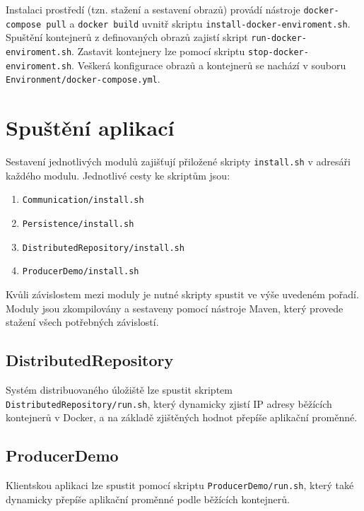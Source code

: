 Instalaci prostředí (tzn. stažení a sestavení obrazů) provádí nástroje \texttt{docker-compose pull} a \texttt{docker build} uvnitř skriptu \texttt{install-docker-enviroment.sh}. Spuštění kontejnerů z definovaných obrazů zajistí skript \texttt{run-docker-enviroment.sh}. Zastavit kontejnery lze pomocí skriptu \texttt{stop-docker-enviroment.sh}. Veškerá konfigurace obrazů a kontejnerů se nachází v souboru \texttt{Environment/docker-compose.yml}.

\chapter{Spuštění aplikací} \label{launching}
Sestavení jednotlivých modulů zajišťují přiložené skripty \texttt{install.sh} v adresáři každého modulu. Jednotlivé cesty ke skriptům jsou:

\begin{enumerate}
    \item \texttt{Communication/install.sh}
    
    \item \texttt{Persistence/install.sh}
    
    \item \texttt{DistributedRepository/install.sh}
    
    \item \texttt{ProducerDemo/install.sh}
\end{enumerate}

\noindent Kvůli závislostem mezi moduly je nutné skripty spustit ve výše uvedeném pořadí. Moduly jsou zkompilovány a sestaveny pomocí nástroje Maven, který provede stažení všech potřebných závislostí.

\section{DistributedRepository}
Systém distribuovaného úložiště lze spustit skriptem \texttt{DistributedRepository/run.sh}, který dynamicky zjistí IP adresy běžících kontejnerů v Docker, a na základě zjištěných hodnot přepíše aplikační proměnné.

\section{ProducerDemo}
Klientskou aplikaci lze spustit pomocí skriptu \texttt{ProducerDemo/run.sh}, který také dynamicky přepíše aplikační proměnné podle běžících kontejnerů.

